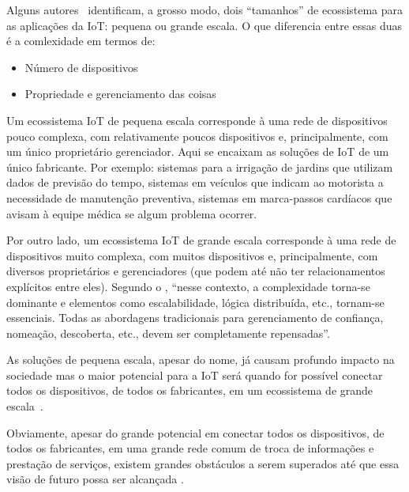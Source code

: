 \documentclass[pdftex, brazil, 12pt, twoside]{article}
\begin{document}
Alguns autores~\citep{UKGOSWalportIoT2014,IEEEIoTDefinition,BarbozaTCCIoT2015}
identificam, a grosso modo, dois ``tamanhos'' de ecossistema para as aplicações da IoT:
pequena ou grande escala. O que diferencia entre essas duas é a comlexidade em termos
de:

\begin{itemize}[noitemsep]
\item Número de dispositivos
\item Propriedade e gerenciamento das coisas
\end{itemize}

Um ecossistema IoT de pequena escala corresponde à uma rede de dispositivos
pouco complexa, com relativamente poucos dispositivos e, principalmente, com
um único proprietário gerenciador. Aqui se encaixam as soluções
de IoT de um único fabricante. Por exemplo: sistemas para a irrigação de jardins
que utilizam dados de previsão do tempo, sistemas em veículos que indicam ao
motorista a necessidade de manutenção preventiva, sistemas em marca-passos cardíacos
que avisam à equipe médica se algum problema ocorrer.

Por outro lado, um ecossistema IoT de grande escala corresponde à uma rede
de dispositivos muito complexa, com muitos dispositivos e, principalmente, com
diversos proprietários e gerenciadores (que podem até não ter relacionamentos
explícitos entre eles). Segundo o \citet{IEEEIoTDefinition}, ``nesse contexto,
a complexidade torna-se dominante e elementos como escalabilidade, lógica distribuída,
etc., tornam-se essenciais. Todas as abordagens tradicionais para gerenciamento
de confiança, nomeação, descoberta, etc., devem ser completamente repensadas''.

As soluções de pequena escala, apesar do nome, já causam profundo impacto na sociedade
mas o maior potencial para a IoT será quando for possível conectar todos os dispositivos,
de todos os fabricantes, em um ecossistema de grande escala~\citep{UKGOSWalportIoT2014,IEEEIoTDefinition,BhattIoT,IEEEIoTReport,McKinseyIoTHype,MoolayilIoT2016,RajIoT2017,OliverWymanIoT2015,SAPFutureIoT,CiscoIoEPublicSectorOpportunity,CiscoIoTFAQ2013,CiscoIoTVS2013,CiscoIoEPublicSectorEconomicAnalysis,CiscoIoESurvey2013,CiscoIoEValuePrivate2013,CiscoIoEValuePublic2013}.

Obviamente, apesar do grande potencial em conectar todos os dispositivos, de todos
os fabricantes, em uma grande rede comum de troca de informações e prestação de
serviços, existem grandes obstáculos a serem superados até que essa visão de futuro
possa ser alcançada \citep{UKGOSWalportIoT2014}.
\end{document}
